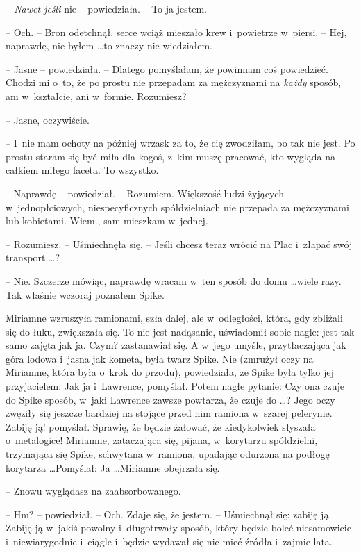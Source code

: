 \documentclass[oneside,polish,11pt,rmheadings]{mwbk}
\begin{document}
\textit{-- Nawet jeśli }nie -- powiedziała. -- To ja jestem. 

-- Och. -- Bron odetchnął, serce wciąż mieszało krew i~powietrze w~piersi. -- Hej, naprawdę, nie byłem \ldots   to znaczy nie wiedziałem. 

-- Jasne -- powiedziała. -- Dlatego pomyślałam, że powinnam coś powiedzieć. Chodzi mi o~to, że po prostu nie przepadam za mężczyznami na \textit{każdy} sposób, ani w~kształcie, ani w~formie. Rozumiesz? 

-- Jasne, oczywiście. 

-- I~nie mam ochoty na później wrzask za to, że cię zwodziłam, bo tak nie jest. Po prostu staram się być miła dla kogoś, z~kim muszę pracować, kto wygląda na całkiem miłego faceta. To wszystko. 

-- Naprawdę -- powiedział. -- Rozumiem. Większość ludzi żyjących w~jednopłciowych, niespecyficznych spółdzielniach nie przepada za mężczyznami lub kobietami. Wiem., sam mieszkam w~jednej. 

-- Rozumiesz. -- Uśmiechnęła się. -- Jeśli chcesz teraz wrócić na Plac i~złapać swój transport \ldots ? 

-- Nie. Szczerze mówiąc, naprawdę wracam w~ten sposób do domu \ldots  wiele razy. Tak właśnie wczoraj poznałem Spike. 

Miriamne wzruszyła ramionami, szła dalej, ale w~odległości, która, gdy zbliżali się do łuku, zwiększała się. To nie jest nadąsanie, uświadomił sobie nagle: jest tak samo zajęta jak ja. Czym? zastanawiał się. A w~jego umyśle, przytłaczająca jak góra lodowa i~jasna jak kometa, była twarz Spike. Nie (zmrużył oczy na Miriamne, która była o~krok do przodu), powiedziała, że Spike była tylko jej przyjacielem: Jak ja i~Lawrence, pomyślał. Potem nagłe pytanie: Czy ona czuje do Spike sposób, w~jaki Lawrence zawsze powtarza, że czuje do \ldots ? Jego oczy zwęziły się jeszcze bardziej na stojące przed nim ramiona w~szarej pelerynie. Zabiję ją! pomyślał. Sprawię, że będzie żałować, że kiedykolwiek słyszała o~metalogice! Miriamne, zataczająca się, pijana, w~korytarzu spółdzielni, trzymająca się Spike, schwytana w~ramiona, upadając odurzona na podłogę korytarza \ldots  Pomyślał: Ja \ldots  Miriamne obejrzała się.  

-- Znowu wyglądasz na zaabsorbowanego. 

-- Hm? -- powiedział. -- Och. Zdaje się, że jestem. -- Uśmiechnął się: zabiję ją. Zabiję ją w~jakiś powolny i~długotrwały sposób, który będzie boleć niesamowicie i~niewiarygodnie i~ciągle i~będzie wydawał się nie mieć źródła i~zajmie lata. 
\end{document}
